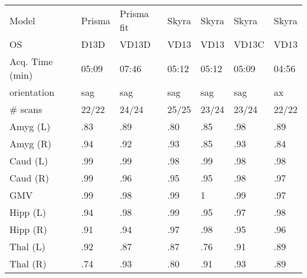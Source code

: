 \begin{table}
\begin{tabular}{lllllll}
Model                 &               Prisma &           Prisma fit &              Skyra &               Skyra &               Skyra &               Skyra \\
OS                    &                 D13D &                VD13D &               VD13 &                VD13 &               VD13C &                VD13 \\
Acq. Time (min)       &             05:09 &             07:46 &           05:12 &            05:12 &            05:09 &            04:56 \\
orientation           &                  sag &                  sag &                sag &                 sag &                 sag &                  ax \\
\# scans & 22/22 & 24/24 & 25/25 & 23/24 & 23/24 &22/22 \\
\midrule
Amyg (L)              &                 .83 &                 .89 &               .80 &                .85 &                .98 &                .89 \\
Amyg (R)              &                 .94 &                 .92 &               .93 &                .85 &                .93 &                .84 \\
Caud (L)              &                 .99 &                 .99 &               .98 &                .99 &                .98 &                .98 \\
Caud (R)              &                 .99 &                 .96 &               .95 &                .95 &                .98 &                .97 \\
GMV                   &                 .99 &                 .98 &               .99 &                1   &                .99 &                .97 \\
Hipp (L)              &                 .94 &                 .98 &               .99 &                .95 &                .97 &                .98 \\
Hipp (R)              &                 .91 &                 .94 &               .97 &                .98 &                .95 &                .96 \\
Thal (L)              &                 .92 &                 .87 &               .87 &                .76 &                .91 &                .89 \\
Thal (R)              &                 .74 &                 .93 &               .80 &                .91 &                .93 &                .89 \\

\end{tabular}
\end{table}
